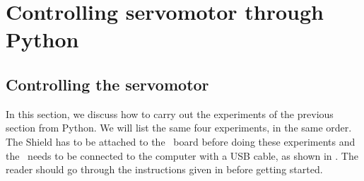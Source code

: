 \section{Controlling servomotor through Python}
\subsection{Controlling the servomotor}
\label{sec:servo-py}
In this section, we discuss how to carry out the experiments of the
previous section from Python.  We will list the same four experiments,
in the same order. The Shield has to be attached to the \arduino\ board
before doing these experiments and the \arduino\ needs to be connected to the computer 
with a USB cable, as shown in . The reader should go through the instructions given in
 before getting started.


